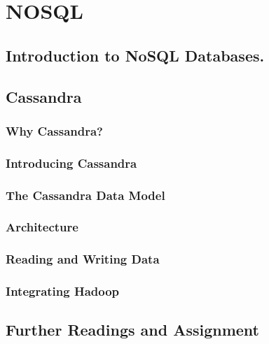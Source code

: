 \section{NOSQL}
\subsection{Introduction to NoSQL Databases.}
\subsection{Cassandra}
\subsubsection{Why Cassandra?}
\subsubsection{Introducing Cassandra}
\subsubsection{The Cassandra Data Model}
\subsubsection{Architecture}
\subsubsection{Reading and Writing Data}
\subsubsection{Integrating Hadoop}
\subsection{Further Readings and Assignment}